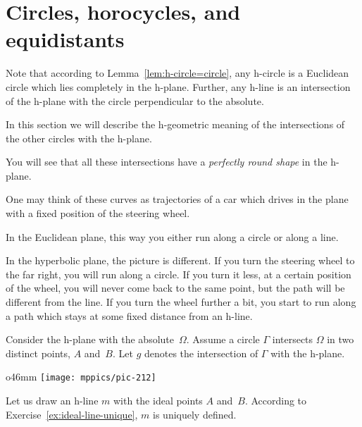 \section*{Circles, horocycles, and equidistants}


Note that according to Lemma~\ref{lem:h-circle=circle},
any h-circle is a Euclidean circle which lies completely in the h-plane.
Further, any h-line is an intersection of the h-plane with the circle 
perpendicular to the absolute.

In this section we will describe the 
h-geometric meaning of the intersections 
of the other circles with the h-plane.

You will see that all these intersections have a {}\emph{perfectly round shape} in the h-plane.

One may think of these curves as trajectories of a car which drives in the plane with a fixed position of the steering wheel.

In the Euclidean plane, 
this way you either run along a circle or along a line.

In the hyperbolic plane, the picture is different.
If you turn the steering wheel to the far right, you will run along a circle.
If you turn it less, at a certain position of the wheel, you will never come back to the same point, but the path will be different from the line.
If you turn the wheel further a bit, you start to run along a path which stays at some fixed distance from an h-line.

Consider the h-plane with the absolute~$\Omega$.
Assume a circle $\Gamma$ intersects $\Omega$ in two distinct points, $A$ and~$B$. 
Let $g$ denotes the intersection of $\Gamma$ with the h-plane.

\begin{wrapfigure}{o}{46mm}
\vskip-0mm
\centering
\texttt{[image: mppics/pic-212]}
\end{wrapfigure}

Let us draw an h-line $m$ with the ideal points $A$ and~$B$.
According to Exercise~\ref{ex:ideal-line-unique}, $m$ is uniquely defined.

